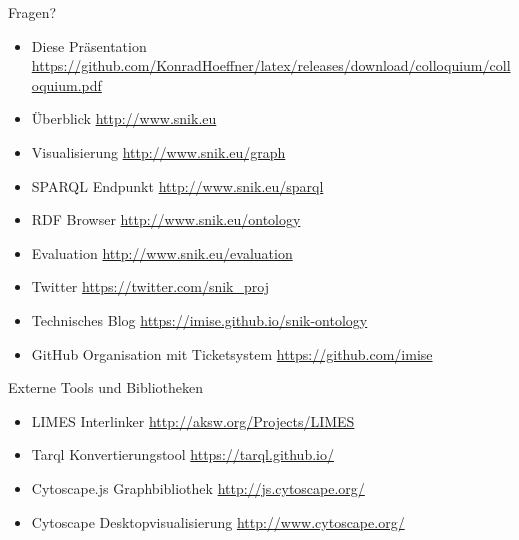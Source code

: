 \documentclass{beamer}
\begin{document}
\begin{frame}[fragile]{Fragen?}
\begin{itemize}
\item Diese Präsentation \url{https://github.com/KonradHoeffner/latex/releases/download/colloquium/colloquium.pdf}
\vspace{0.5em}%
\item Überblick \url{http://www.snik.eu}
\item Visualisierung \url{http://www.snik.eu/graph}
\item SPARQL Endpunkt \url{http://www.snik.eu/sparql}
\item RDF Browser \url{http://www.snik.eu/ontology}
\item Evaluation \url{http://www.snik.eu/evaluation}
\item Twitter \url{https://twitter.com/snik\_proj}
\item Technisches Blog \url{https://imise.github.io/snik-ontology}
\item GitHub Organisation mit Ticketsystem \url{https://github.com/imise}
\end{itemize}
\end{frame}

\begin{frame}[fragile]{Externe Tools und Bibliotheken}
\begin{itemize}
\item LIMES Interlinker \url{http://aksw.org/Projects/LIMES}
\item Tarql Konvertierungstool \url{https://tarql.github.io/}
\item Cytoscape.js Graphbibliothek \url{http://js.cytoscape.org/}
\item Cytoscape Desktopvisualisierung \url{http://www.cytoscape.org/}
\end{itemize}
\end{frame}
 
\end{document}
